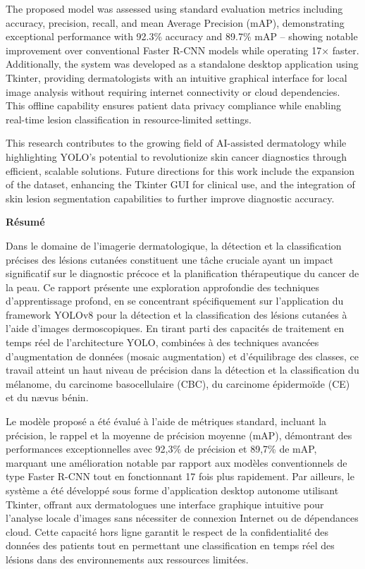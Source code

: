 \documentclass[a4paper,12pt]{report}
\begin{document}
\begin{spacing}{1.5}
    The proposed model was assessed using standard evaluation metrics including accuracy, precision, recall, and mean Average Precision (mAP), demonstrating exceptional performance with 92.3\% accuracy and 89.7\% mAP – showing notable improvement over conventional Faster R-CNN models while operating 17× faster. Additionally, the system was developed as a standalone desktop application using Tkinter, providing dermatologists with an intuitive graphical interface for local image analysis without requiring internet connectivity or cloud dependencies. This offline capability ensures patient data privacy compliance while enabling real-time lesion classification in resource-limited settings.

    This research contributes to the growing field of AI-assisted dermatology while highlighting YOLO's potential to revolutionize skin cancer diagnostics through efficient, scalable solutions. Future directions for this work include the expansion of the dataset, enhancing the Tkinter GUI for clinical use, and the integration of skin lesion segmentation capabilities to further improve diagnostic accuracy.
    
    \newpage
\begin{center}
    \textbf{\huge Résumé}
\end{center}

    Dans le domaine de l'imagerie dermatologique, la détection et la classification précises des lésions cutanées constituent une tâche cruciale ayant un impact significatif sur le diagnostic précoce et la planification thérapeutique du cancer de la peau. Ce rapport présente une exploration approfondie des techniques d'apprentissage profond, en se concentrant spécifiquement sur l'application du framework YOLOv8 pour la détection et la classification des lésions cutanées à l'aide d'images dermoscopiques. En tirant parti des capacités de traitement en temps réel de l'architecture YOLO, combinées à des techniques avancées d'augmentation de données (mosaic augmentation) et d'équilibrage des classes, ce travail atteint un haut niveau de précision dans la détection et la classification du mélanome, du carcinome basocellulaire (CBC), du carcinome épidermoïde (CE) et du nævus bénin.

    Le modèle proposé a été évalué à l'aide de métriques standard, incluant la précision, le rappel et la moyenne de précision moyenne (mAP), démontrant des performances exceptionnelles avec 92,3\% de précision et 89,7\% de mAP, marquant une amélioration notable par rapport aux modèles conventionnels de type Faster R-CNN tout en fonctionnant 17 fois plus rapidement. Par ailleurs, le système a été développé sous forme d'application desktop autonome utilisant Tkinter, offrant aux dermatologues une interface graphique intuitive pour l'analyse locale d'images sans nécessiter de connexion Internet ou de dépendances cloud. Cette capacité hors ligne garantit le respect de la confidentialité des données des patients tout en permettant une classification en temps réel des lésions dans des environnements aux ressources limitées.


\end{spacing}
\end{document}
